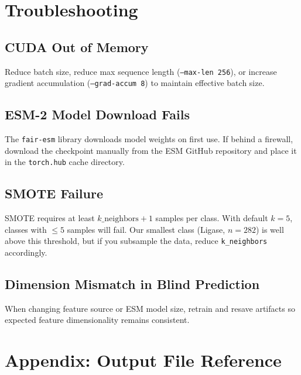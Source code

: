 \documentclass[11pt,a4paper]{article}
\begin{document}
\section{Troubleshooting}
\subsection{CUDA Out of Memory}
Reduce batch size, reduce max sequence length (\texttt{--max-len 256}),
or increase gradient accumulation (\texttt{--grad-accum 8}) to maintain effective batch size.

\subsection{ESM-2 Model Download Fails}
The \texttt{fair-esm} library downloads model weights on first use.
If behind a firewall, download the checkpoint manually from the ESM GitHub repository
and place it in the \texttt{torch.hub} cache directory.

\subsection{SMOTE Failure}
SMOTE requires at least $k\_\mathrm{neighbors} + 1$ samples per class.
With default $k = 5$, classes with $\le 5$ samples will fail.
Our smallest class (Ligase, $n = 282$) is well above this threshold,
but if you subsample the data, reduce \texttt{k\_neighbors} accordingly.

\subsection{Dimension Mismatch in Blind Prediction}
When changing feature source or ESM model size, retrain and resave artifacts
so expected feature dimensionality remains consistent.

\section{Appendix: Output File Reference}
\end{document}
